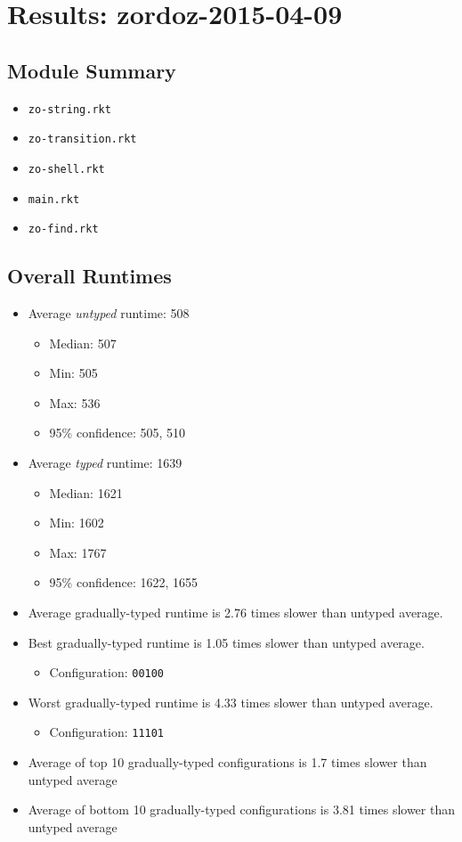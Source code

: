 \documentclass{article}
\newcommand{\mono}[1]{\texttt{#1}}
\begin{document}
\section{Results: zordoz-2015-04-09}

\subsection{Module Summary}
\begin{itemize}
\item \mono{zo-string.rkt}
\item \mono{zo-transition.rkt}
\item \mono{zo-shell.rkt}
\item \mono{main.rkt}
\item \mono{zo-find.rkt}\end{itemize}

\subsection{Overall Runtimes}
\begin{itemize}
\item Average \emph{untyped} runtime: 508
  \begin{itemize}
  \item Median: 507
  \item Min: 505
  \item Max: 536
  \item 95\% confidence: 505, 510
  \end{itemize}
\item Average \emph{typed} runtime: 1639
  \begin{itemize}
  \item Median: 1621
  \item Min: 1602
  \item Max: 1767
  \item 95\% confidence: 1622, 1655
  \end{itemize}
\item Average gradually-typed runtime is 2.76 times slower than untyped average.
\item Best gradually-typed runtime is 1.05 times slower than untyped average.
\begin{itemize}\item Configuration: \mono{00100}\end{itemize}
\item Worst gradually-typed runtime is 4.33 times slower than untyped average.
\begin{itemize}\item Configuration: \mono{11101}\end{itemize}
\item Average of top 10 gradually-typed configurations is 1.7 times slower than untyped average
\item Average of bottom 10 gradually-typed configurations is 3.81 times slower than untyped average
\end{itemize}
\end{document}
